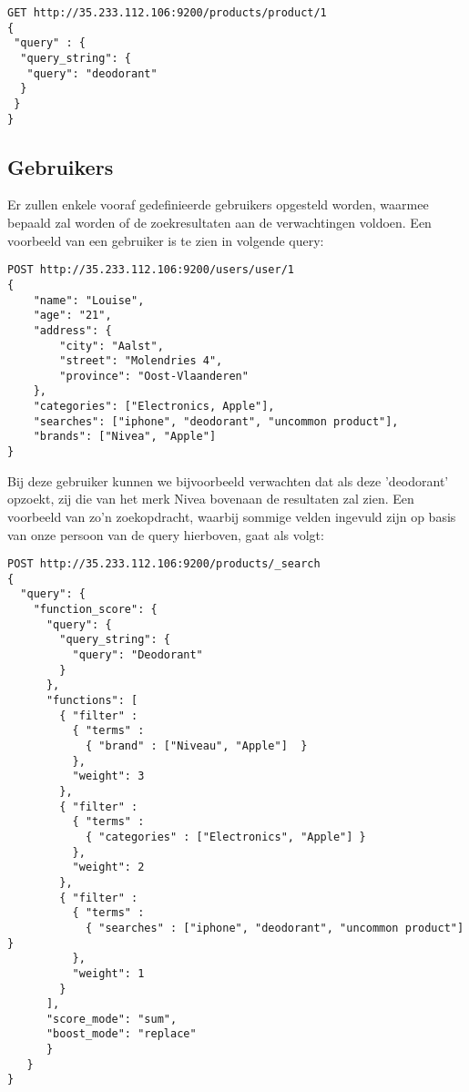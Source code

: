 \begin{lstlisting}[caption={Query om één enkel product op te halen},captionpos=b]
GET http://35.233.112.106:9200/products/product/1 
{
 "query" : {
  "query_string": {
   "query": "deodorant"
  }
 }
}
\end{lstlisting}

\subsection{Gebruikers}

Er zullen enkele vooraf gedefinieerde gebruikers opgesteld worden, waarmee bepaald zal worden of de zoekresultaten aan de verwachtingen voldoen. Een voorbeeld van een gebruiker is te zien in volgende query:
\begin{lstlisting}[caption={Query om één enkele gebruiker aan te maken}]
POST http://35.233.112.106:9200/users/user/1
{
	"name": "Louise",
	"age": "21",
	"address": {
		"city": "Aalst",
		"street": "Molendries 4",
		"province": "Oost-Vlaanderen"
	},
	"categories": ["Electronics, Apple"],
	"searches": ["iphone", "deodorant", "uncommon product"],
	"brands": ["Nivea", "Apple"]
}
\end{lstlisting}

Bij deze gebruiker kunnen we bijvoorbeeld verwachten dat als deze 'deodorant' opzoekt, zij die van het merk Nivea bovenaan de resultaten zal zien. Een voorbeeld van zo'n zoekopdracht, waarbij sommige velden ingevuld zijn op basis van onze persoon van de query hierboven, gaat als volgt:

\begin{lstlisting}[caption={Query om een zoekopdracht met term 'Deodorant' uit te voeren, met filters en een score op basis van informatie van een gebruiker}]
POST http://35.233.112.106:9200/products/_search
{
  "query": {
    "function_score": {
      "query": {
        "query_string": {
          "query": "Deodorant"
        }
      },
      "functions": [
        { "filter" : 
          { "terms" : 
            { "brand" : ["Niveau", "Apple"]  } 
          },
          "weight": 3
        },
        { "filter" : 
          { "terms" : 
            { "categories" : ["Electronics", "Apple"] }
          },
          "weight": 2
        },
        { "filter" : 
          { "terms" : 
            { "searches" : ["iphone", "deodorant", "uncommon product"] } 
          },
          "weight": 1
        }
      ],
      "score_mode": "sum",
      "boost_mode": "replace"
      }
   }
}
\end{lstlisting}


